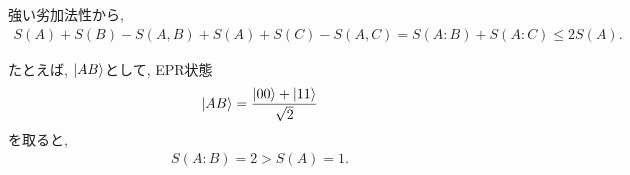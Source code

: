 \begin{ex}
    \label{ex11.25}
\end{ex}

\begin{ex}
    \label{ex11.26}
    強い劣加法性から,
    \begin{align*}
        S(A) + S(B) - S(A,B) +
        S(A) + S(C) - S(A,C)
        =
        S(A:B) + S(A:C)
        \le
        2S(A).
    \end{align*}
    \par
    たとえば, $\ket{AB}$として, EPR状態
    \begin{align*}
        \ket{AB} = \frac{\ket{00} + \ket{11}}{\sqrt{2}}
    \end{align*} 
    を取ると, 
    \begin{align*}
        S(A:B) = 2 > S(A) = 1.
    \end{align*}
\end{ex}